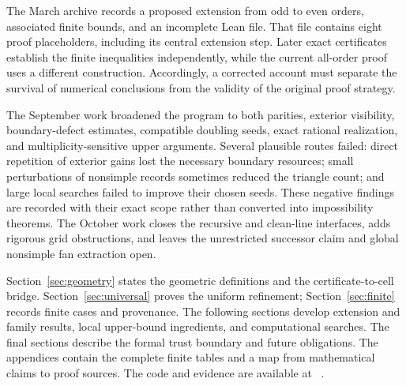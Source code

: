 The March archive records a proposed extension from odd to even orders, associated finite bounds, and an incomplete Lean file. That file contains eight proof placeholders, including its central extension step. Later exact certificates establish the finite inequalities independently, while the current all-order proof uses a different construction. Accordingly, a corrected account must separate the survival of numerical conclusions from the validity of the original proof strategy.

The September work broadened the program to both parities, exterior visibility, boundary-defect estimates, compatible doubling seeds, exact rational realization, and multiplicity-sensitive upper arguments. Several plausible routes failed: direct repetition of exterior gains lost the necessary boundary resources; small perturbations of nonsimple records sometimes reduced the triangle count; and large local searches failed to improve their chosen seeds. These negative findings are recorded with their exact scope rather than converted into impossibility theorems. The October work closes the recursive and clean-line interfaces, adds rigorous grid obstructions, and leaves the unrestricted successor claim and global nonsimple fan extraction open.

Section~\ref{sec:geometry} states the geometric definitions and the certificate-to-cell bridge. Section~\ref{sec:universal} proves the uniform refinement; Section~\ref{sec:finite} records finite cases and provenance. The following sections develop extension and family results, local upper-bound ingredients, and computational searches. The final sections describe the formal trust boundary and future obligations. The appendices contain the complete finite tables and a map from mathematical claims to proof sources. The code and evidence are available at \repo~\cite{zarzueloRepository}.
